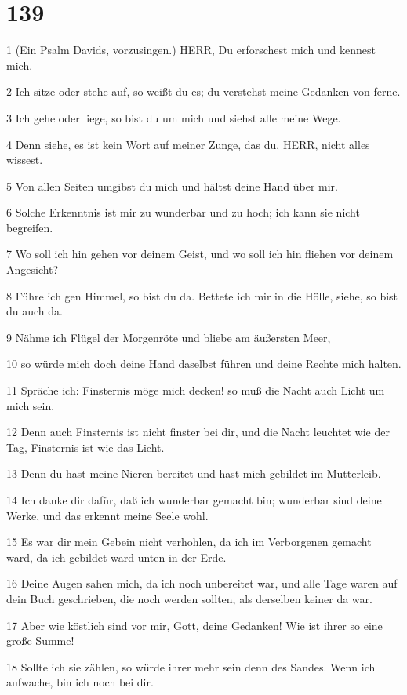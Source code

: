 \chapter{139}

\par 1 (Ein Psalm Davids, vorzusingen.) HERR, Du erforschest mich und kennest mich.
\par 2 Ich sitze oder stehe auf, so weißt du es; du verstehst meine Gedanken von ferne.
\par 3 Ich gehe oder liege, so bist du um mich und siehst alle meine Wege.
\par 4 Denn siehe, es ist kein Wort auf meiner Zunge, das du, HERR, nicht alles wissest.
\par 5 Von allen Seiten umgibst du mich und hältst deine Hand über mir.
\par 6 Solche Erkenntnis ist mir zu wunderbar und zu hoch; ich kann sie nicht begreifen.
\par 7 Wo soll ich hin gehen vor deinem Geist, und wo soll ich hin fliehen vor deinem Angesicht?
\par 8 Führe ich gen Himmel, so bist du da. Bettete ich mir in die Hölle, siehe, so bist du auch da.
\par 9 Nähme ich Flügel der Morgenröte und bliebe am äußersten Meer,
\par 10 so würde mich doch deine Hand daselbst führen und deine Rechte mich halten.
\par 11 Spräche ich: Finsternis möge mich decken! so muß die Nacht auch Licht um mich sein.
\par 12 Denn auch Finsternis ist nicht finster bei dir, und die Nacht leuchtet wie der Tag, Finsternis ist wie das Licht.
\par 13 Denn du hast meine Nieren bereitet und hast mich gebildet im Mutterleib.
\par 14 Ich danke dir dafür, daß ich wunderbar gemacht bin; wunderbar sind deine Werke, und das erkennt meine Seele wohl.
\par 15 Es war dir mein Gebein nicht verhohlen, da ich im Verborgenen gemacht ward, da ich gebildet ward unten in der Erde.
\par 16 Deine Augen sahen mich, da ich noch unbereitet war, und alle Tage waren auf dein Buch geschrieben, die noch werden sollten, als derselben keiner da war.
\par 17 Aber wie köstlich sind vor mir, Gott, deine Gedanken! Wie ist ihrer so eine große Summe!
\par 18 Sollte ich sie zählen, so würde ihrer mehr sein denn des Sandes. Wenn ich aufwache, bin ich noch bei dir.
